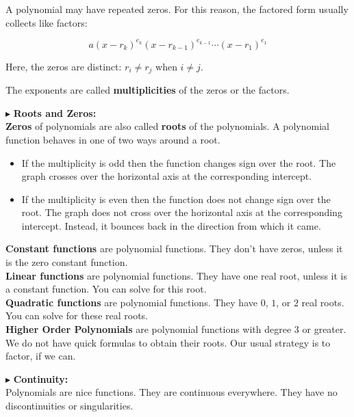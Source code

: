 \documentclass{ximera}
\begin{document}
A polynomial may have repeated zeros.  For this reason, the factored form usually collects like factors:


\[   a (x - r_k)^{e_k} (x - r_{k-1})^{e_{k-1}} \cdots (x - r_1)^{e_1}             \]


Here, the zeros are distinct:  $r_i \ne r_j$ when $i \ne j$.

The exponents are called \textbf{\textcolor{purple!85!blue}{multiplicities}} of the zeros or the factors. 






$\blacktriangleright$   \textbf{\textcolor{red!10!blue!90!}{Roots and Zeros:}} \\ 
\textbf{Zeros} of polynomials are also called \textbf{roots} of the polynomials.  A polynomial function behaves in one of two ways around a root.

\begin{itemize}
\item If the multiplicity is odd then the function changes sign over the root.  The graph crosses over the horizontal axis at the corresponding intercept.
\item If the multiplicity is even then the function does not change sign over the root.  The graph does not cross over the horizontal axis at the corresponding intercept. Instead, it bounces back in the direction from which it came.
\end{itemize}


\textbf{Constant functions} are polynomial functions.  They don't have zeros, unless it is the zero constant function.  \\


\textbf{Linear functions} are polynomial functions. They have one real root, unless it is a constant function.  You can solve for this root. \\


\textbf{Quadratic functions} are polynomial functions. They have $0$, $1$, or $2$ real roots.  You can solve for these real roots. \\


\textbf{Higher Order Polynomials} are polynomial functions with degree $3$ or greater.  We do not have quick formulas to obtain their roots.  Our usual strategy is to factor, if we can.  





$\blacktriangleright$ \textbf{\textcolor{red!10!blue!90!}{Continuity:}} \\ 
Polynomials are nice functions.  They are continuous everywhere.  They have no discontinuities or singularities.
\end{document}
